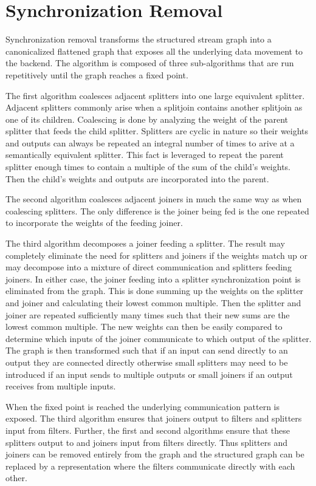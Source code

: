 \section{Synchronization Removal}
\label{sec:synchremoval}

Synchronization removal transforms the structured stream graph into a
canonicalized flattened graph that exposes all the underlying data
movement to the backend. The algorithm is composed of three
sub-algorithms that are run repetitively until the graph reaches a
fixed point.

The first algorithm coalesces adjacent splitters into one large
equivalent splitter. Adjacent splitters commonly arise when a
splitjoin contains another splitjoin as one of its
children. Coalescing is done by analyzing the weight of the parent
splitter that feeds the child splitter. Splitters are cyclic in nature
so their weights and outputs can always be repeated an integral number
of times to arive at a semantically equivalent splitter. This fact is
leveraged to repeat the parent splitter enough times to contain a
multiple of the sum of the child's weights. Then the child's weights
and outputs are incorporated into the parent.

The second algorithm coalesces adjacent joiners in much the same way
as when coalescing splitters. The only difference is the joiner being
fed is the one repeated to incorporate the weights of the feeding joiner.

The third algorithm decomposes a joiner feeding a splitter. The result
may completely eliminate the need for splitters and joiners if the weights
match up or may decompose into a mixture of direct communication and
splitters feeding joiners. In either case, the joiner feeding into a
splitter synchronization point is eliminated from the graph. This is
done summing up the weights on the splitter and joiner and calculating
their lowest common multiple. Then the splitter and joiner are
repeated sufficiently many times such that their new sums are the lowest
common multiple. The new weights can then be easily compared to
determine which inputs of the joiner communicate to which output of
the splitter. The graph is then transformed such that if an input can
send directly to an output they are connected directly otherwise small
splitters may need to be introduced if an input sends to multiple
outputs or small joiners if an output receives from multiple inputs.

When the fixed point is reached the underlying communication pattern
is exposed. The third algorithm ensures that joiners output to filters
and splitters input from filters. Further, the first and second
algorithms ensure that these splitters output to and joiners input
from filters directly. Thus splitters and joiners can be removed
entirely from the graph and the structured graph can be replaced by a
representation where the filters communicate directly with each other.